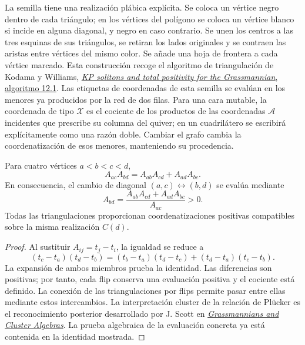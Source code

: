 La semilla tiene una realización plábica explícita. Se coloca un vértice
negro dentro de cada triángulo; en los vértices del polígono se coloca un
vértice blanco si incide en alguna diagonal, y negro en caso contrario.
Se unen los centros a las tres esquinas de sus triángulos, se retiran los
lados originales y se contraen las aristas entre vértices del mismo color.
Se añade una hoja de frontera a cada vértice marcado. Esta construcción
recoge el algoritmo de triangulación de Kodama y Williams,
\href{https://people.math.harvard.edu/~williams/papers/KW-ArxivVersion.pdf}
{\emph{KP solitons and total positivity for the Grassmannian}, algoritmo 12.1}.
Las etiquetas de coordenadas de esta semilla se evalúan en los menores ya
producidos por la red de dos filas. Para una cara mutable, la coordenada
de tipo \(\mathcal X\) es el cociente de los productos de las
coordenadas \(\mathcal A\) incidentes que prescribe su columna del
quiver; en un cuadrilátero se escribirá explícitamente como una razón
doble. Cambiar el grafo cambia la coordenatización de esos menores, manteniendo su
procedencia.

\begin{theorem}
\label{thm:nc-ptolemy}
Para cuatro vértices \(a<b<c<d\),
\begin{equation}
 A_{ac}A_{bd}=A_{ab}A_{cd}+A_{ad}A_{bc}.
 \label{eq:nc-ptolemy}
\end{equation}
En consecuencia, el cambio de diagonal \((a,c)\leftrightarrow(b,d)\)
se evalúa mediante
\[
 A_{bd}=\frac{A_{ab}A_{cd}+A_{ad}A_{bc}}{A_{ac}}>0.
\]
Todas las triangulaciones proporcionan coordenatizaciones positivas compatibles sobre
la misma realización \(C(d)\).
\end{theorem}
\begin{proof}
Al sustituir \(A_{ij}=t_j-t_i\), la igualdad se reduce a
\[
 (t_c-t_a)(t_d-t_b)
 =(t_b-t_a)(t_d-t_c)+(t_d-t_a)(t_c-t_b).
\]
La expansión de ambos miembros prueba la identidad. Las diferencias son
positivas; por tanto, cada flip conserva una evaluación positiva y el
cociente está definido. La conexión de las triangulaciones por flips
permite pasar entre ellas mediante estos intercambios. La interpretación
cluster de la relación de Plücker es el reconocimiento posterior desarrollado
por J. Scott en
\href{https://arxiv.org/abs/math/0311148}{\emph{Grassmannians and Cluster
Algebras}}. La prueba algebraica de la evaluación concreta ya está contenida
en la identidad mostrada.
\end{proof}

